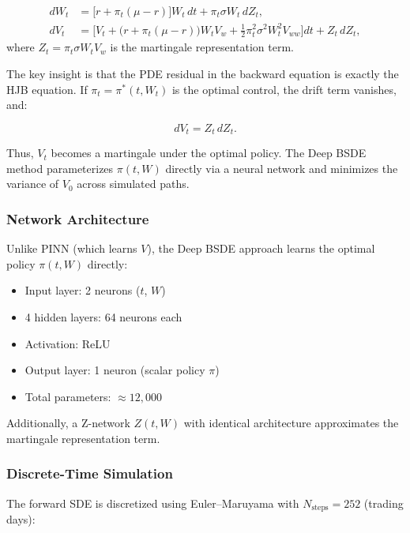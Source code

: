 \documentclass[12pt,a4paper]{article}
\begin{document}
\begin{align}
dW_t &= \bigl[r + \pi_t(\mu - r)\bigr] W_t \, dt + \pi_t \sigma W_t \, dZ_t, \label{eq:bsde_forward}\\
dV_t &= \bigl[ V_t + \bigl(r + \pi_t(\mu - r)\bigr) W_t V_w + \tfrac{1}{2} \pi_t^2 \sigma^2 W_t^2 V_{ww} \bigr] dt + Z_t \, dZ_t, \label{eq:bsde_backward}
\end{align}
where $Z_t = \pi_t \sigma W_t V_w$ is the martingale representation term.

The key insight is that the PDE residual in the backward equation is exactly the HJB equation. If $\pi_t = \pi^*(t, W_t)$ is the optimal control, the drift term vanishes, and:

\begin{equation}
\label{eq:bsde_optimal}
dV_t = Z_t \, dZ_t.
\end{equation}

Thus, $V_t$ becomes a martingale under the optimal policy. The Deep BSDE method parameterizes $\pi(t, W)$ directly via a neural network and minimizes the variance of $V_0$ across simulated paths.

\subsubsection{Network Architecture}

Unlike PINN (which learns $V$), the Deep BSDE approach learns the optimal policy $\pi(t, W)$ directly:

\begin{itemize}
    \item Input layer: 2 neurons ($t$, $W$)
    \item 4 hidden layers: 64 neurons each
    \item Activation: ReLU
    \item Output layer: 1 neuron (scalar policy $\pi$)
    \item Total parameters: $\approx 12,000$
\end{itemize}

Additionally, a Z-network $Z(t, W)$ with identical architecture approximates the martingale representation term.

\subsubsection{Discrete-Time Simulation}

The forward SDE is discretized using Euler--Maruyama with $N_{\text{steps}} = 252$ (trading days):
\end{document}
